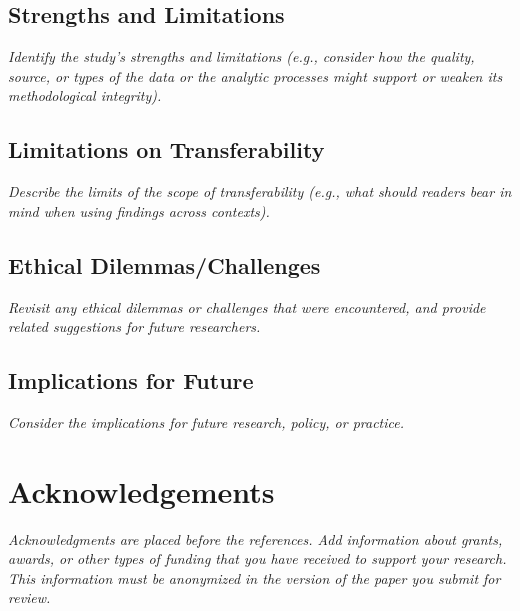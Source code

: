 \documentclass[acmsmall]{acmart}
\begin{document}
\subsection{Strengths and Limitations}

{\em\small Identify the study’s strengths and limitations (e.g., consider how the quality, source, or types of the data or the analytic processes might support or weaken its methodological integrity).}

\subsection{Limitations on Transferability}

{\em\small Describe the limits of the scope of transferability (e.g., what should readers bear in mind when using findings across contexts). }

\subsection{Ethical Dilemmas/Challenges}

{\em\small Revisit any ethical dilemmas or challenges that were encountered, and provide related suggestions for future researchers. }

\subsection{Implications for Future}

{\em\small Consider the implications for future research, policy, or practice.}

\section{Acknowledgements}

{\em\small Acknowledgments are placed before the references. Add information about grants, awards, or other types of funding that you have received to support your research. This information must be anonymized in the version of the paper you submit for review. }



\end{document}
